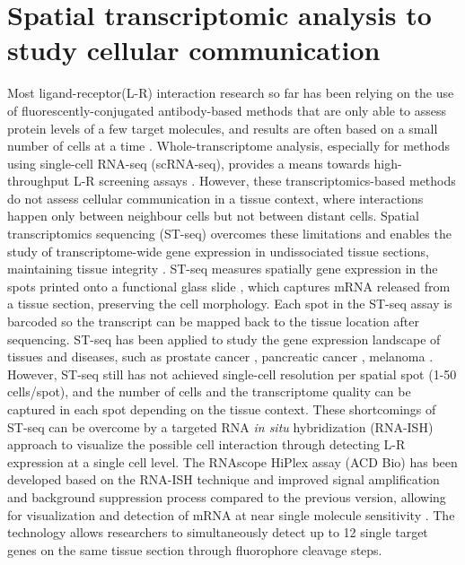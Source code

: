 \section{Spatial transcriptomic analysis to study cellular communication}
\label{Sec:2.1_intro}	%
Most ligand-receptor(L-R) interaction research so far has been relying on the use of fluorescently-conjugated antibody-based methods that are only able to assess protein levels of a few target molecules, and results are often based on a small number of cells at a time \cite{moses2022museum, lewis2021spatial}. Whole-transcriptome analysis, especially for methods using single-cell RNA-seq (scRNA-seq), provides a means towards high-throughput L-R screening assays \cite{browaeys2020nichenet, efremova2020cellphonedb}. However, these transcriptomics-based methods do not assess cellular communication in a tissue context, where interactions happen only between neighbour cells but not between distant cells. Spatial transcriptomics sequencing (ST-seq) overcomes these limitations and enables the study of transcriptome-wide gene expression in undissociated tissue sections, maintaining tissue integrity \cite{salmen2018barcoded}. ST-seq measures spatially gene expression in the spots printed onto a functional glass slide \cite{salmen2018barcoded}, which captures mRNA released from a tissue section, preserving the cell morphology. Each spot in the ST-seq assay is barcoded so the transcript can be mapped back to the tissue location after sequencing. ST-seq has been applied to study the gene expression landscape of tissues and diseases, such as prostate cancer \cite{berglund2018spatial, ji2020multimodal}, pancreatic cancer \cite{moncada2019integrating}, melanoma \cite{thrane2018spatially}. However, ST-seq still has not achieved single-cell resolution per spatial spot (1-50 cells/spot), and the number of cells and the transcriptome quality can be captured in each spot depending on the tissue context. These shortcomings of ST-seq can be overcome by a targeted RNA \textit{in situ} hybridization (RNA-ISH) approach to visualize the possible cell interaction through detecting L-R expression at a single cell level. The RNAscope HiPlex assay (ACD Bio) has been developed based on the RNA-ISH technique and improved signal amplification and background suppression process compared to the previous version, allowing for visualization and detection of mRNA at near single molecule sensitivity \cite{wang2012rnascope,schulz2018simultaneous}. The technology allows researchers to simultaneously detect up to 12 single target genes on the same tissue section through fluorophore cleavage steps.  

